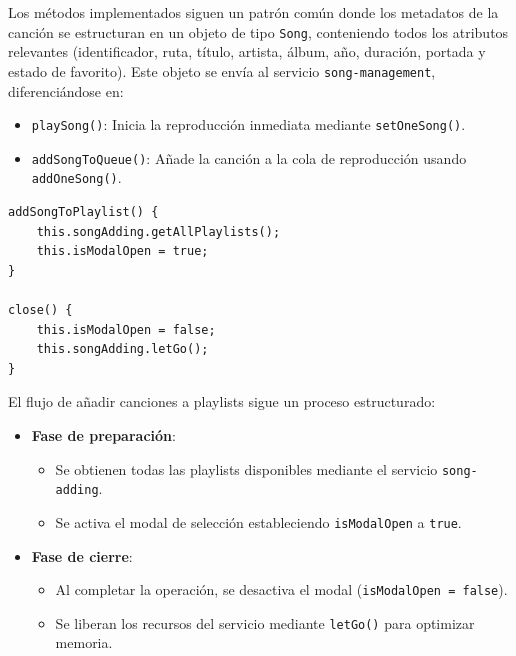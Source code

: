 \documentclass[11pt, a4paper]{article}
\begin{document}
                Los métodos implementados siguen un patrón común donde los metadatos de la canción se estructuran en un objeto de tipo \texttt{Song}, conteniendo todos los atributos relevantes (identificador, ruta, título, artista, álbum, año, duración, portada y estado de favorito). Este objeto se envía al servicio \texttt{song-management}, diferenciándose en:

                \begin{itemize}
                    \item \texttt{playSong()}: Inicia la reproducción inmediata mediante \texttt{setOneSong()}.
                    \item \texttt{addSongToQueue()}: Añade la canción a la cola de reproducción usando \texttt{addOneSong()}.
                \end{itemize}

                \begin{lstlisting}[caption={addSongToPlaylist()}]
addSongToPlaylist() {
    this.songAdding.getAllPlaylists();
    this.isModalOpen = true;
}

close() {
    this.isModalOpen = false;
    this.songAdding.letGo();
}
                \end{lstlisting}

                El flujo de añadir canciones a playlists sigue un proceso estructurado:

                \begin{itemize}
                    \item \textbf{Fase de preparación}:
                    \begin{itemize}
                        \item Se obtienen todas las playlists disponibles mediante el servicio \texttt{song-adding}.
                        \item Se activa el modal de selección estableciendo \texttt{isModalOpen} a \texttt{true}.
                    \end{itemize}
                    
                    \item \textbf{Fase de cierre}:
                    \begin{itemize}
                        \item Al completar la operación, se desactiva el modal (\texttt{isModalOpen = false}).
                        \item Se liberan los recursos del servicio mediante \texttt{letGo()} para optimizar memoria.
                    \end{itemize}
                \end{itemize}
\end{document}

